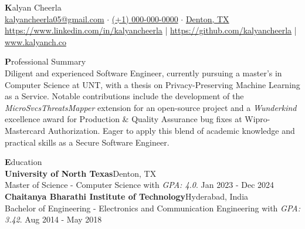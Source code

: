 \documentclass[a4paper]{article}
\begin{document}

\vspace*{-30pt}
\begin{center}
	{\Huge {\textbf{K}alyan Cheerla}}\\
	\vspace*{1mm}
	\href{mailto: kalyancheerla05@gmail.com}{kalyancheerla05@gmail.com} $\cdot$ 
	\href{tel: +10000000000}{(+1) 000-000-0000} $\cdot$ 
	\href{https://www.google.com/maps/place/Denton,+TX/}{Denton, TX}\\
	\href{https://www.linkedin.com/in/kalyancheerla/}{https://www.linkedin.com/in/kalyancheerla} | 
	\href{https://github.com/kalyancheerla}{https://github.com/kalyancheerla} | 
	\href{https://kalyanch.co/}{www.kalyanch.co}\
\end{center}

\vspace*{-2mm}


{\textbf{P}rofessional Summary \hrulefill}\\
{Diligent and experienced Software Engineer, currently pursuing a master's in
 Computer Science at UNT, with a thesis on Privacy-Preserving Machine Learning
 as a Service. Notable contributions include the development of the
 \textit{MicroSvcsThreatsMapper} extension for an open-source project and
 a \textit{Wunderkind} excellence award for Production \& Quality Assurance
 bug fixes at Wipro-Mastercard Authorization.
 Eager to apply this blend of academic knowledge and practical skills as a
 Secure Software Engineer.
}\\

\vspace*{1mm}


{\textbf{E}ducation \hrulefill}\\
\textbf{University of North Texas}\hfill {\small Denton, TX}\\
Master of Science - Computer Science with \textit{GPA: 4.0}. \hfill {\small Jan 2023 - Dec 2024}\\

\textbf{Chaitanya Bharathi Institute of Technology}\hfill {\small Hyderabad, India}\\
Bachelor of Engineering - Electronics and Communication Engineering with \textit{GPA: 3.42}. \hfill {\small Aug 2014 - May 2018}\\

\vspace*{1mm}
\end{document}
